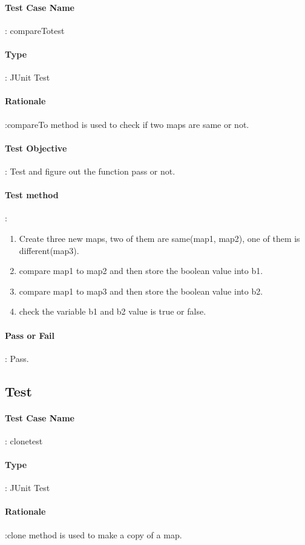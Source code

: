 \documentclass[12pt, a4paper]{report}
\begin{document}
\paragraph{Test Case Name}: compareTotest
\paragraph{Type}: JUnit Test
\paragraph{Rationale}:compareTo method is used to check if two maps are same or not.
\paragraph{Test Objective}: Test and figure out the function pass or not.
\paragraph{Test method}: 
\begin{enumerate}
	\item Create three new maps, two of them are same(map1, map2), one of them is different(map3).
	\item compare map1 to map2 and then store the boolean value into b1.
	\item compare map1 to map3 and then store the boolean value into b2.
	\item check the variable b1 and b2 value is true or false. 
\end{enumerate}
\paragraph{Pass or Fail}: Pass.

\addtocounter{casecounter}{1}
\subsection{Test }
\paragraph{Test Case Name}: clonetest
\paragraph{Type}: JUnit Test
\paragraph{Rationale}:clone method is used to make a copy of a map.
\end{document}
